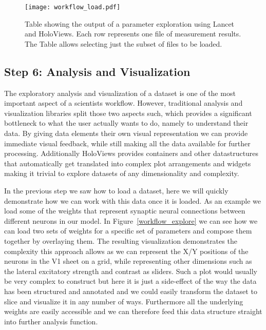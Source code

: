 \begin{figure}
	\centering
        \texttt{[image: workflow\_load.pdf]}
	    \caption[Table summarizing results from parameter analysis in
          Lancet and HoloViews.]{Table showing the output of a
          parameter exploration using Lancet and HoloViews. Each row
          represents one file of measurement results. The Table allows
          selecting just the subset of files to be loaded.}
	\label{workflow_load}
\end{figure}


\subsection{Step 6: Analysis and Visualization}

The exploratory analysis and visualization of a dataset is one of the
most important aspect of a scientists workflow. However, traditional
analysis and visualization libraries split those two aspects such,
which provides a significant bottleneck to what the user actually
wants to do, namely to understand their data. By giving data elements
their own visual representation we can provide immediate visual
feedback, while still making all the data available for further
processing. Additionally HoloViews provides containers and other
datastructures that automatically get translated into complex plot
arrangements and widgets making it trivial to explore datasets of any
dimensionality and complexity.

In the previous step we saw how to load a dataset, here we will
quickly demonstrate how we can work with this data once it is loaded.
As an example we load some of the weights that represent synaptic
neural connections between different neurons in our model. In
Figure~\ref{workflow_explore} we can see how we can load two sets of
weights for a specific set of parameters and compose them together by
overlaying them. The resulting visualization demonstrates the
complexity this approach allows as we can represent the X/Y positions
of the neurons in the V1 sheet on a grid, while representing other
dimensions such as the lateral excitatory strength and contrast as
sliders. Such a plot would usually be very complex to construct but
here it is just a side-effect of the way the data has been structured
and annotated and we could easily transform the dataset to slice and
visualize it in any number of ways. Furthermore all the underlying
weights are easily accessible and we can therefore feed this data
structure straight into further analysis function.

